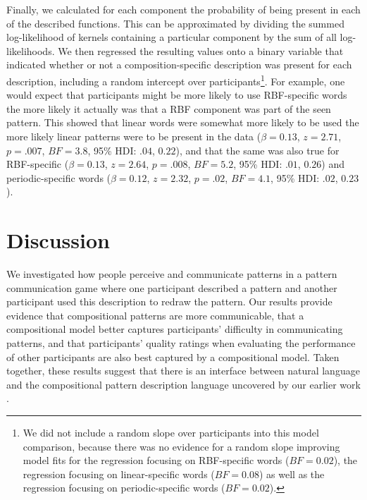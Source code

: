 \documentclass[a4paper,man, floatsintext, natbib]{apa6}
\begin{document}
Finally, we calculated for each component the probability of being present in each of the described functions. This can be approximated by dividing the summed log-likelihood of kernels containing a particular component by the sum of all log-likelihoods. We then regressed the resulting values onto a binary variable that indicated whether or not a composition-specific description was present for each description, including a random intercept over participants\footnote{We did not include a random slope over participants into this model comparison, because there was no evidence for a random slope improving model fits for the regression focusing on RBF-specific words ($BF=0.02$), the regression focusing on linear-specific words ($BF=0.08$) as well as the regression focusing on periodic-specific words ($BF=0.02$).}. For example, one would expect that participants might be more likely to use RBF-specific words the more likely it actually was that a RBF component was part of the seen pattern. This showed that linear words were somewhat more likely to be used the more likely linear patterns were to be present in the data ($\beta=0.13$, $z=2.71$, $p=.007$, $BF=3.8$, 95\% HDI: $.04$, $0.22$), and that the same was also true for RBF-specific ($\beta=0.13$, $z=2.64$, $p=.008$, $BF=5.2$, 95\% HDI: $.01$, $0.26$) and periodic-specific words ($\beta=0.12$, $z=2.32$, $p=.02$, $BF=4.1$, 95\% HDI: $.02$, $0.23$). 


\section{Discussion}

We investigated how people perceive and communicate patterns in a pattern communication game where one participant described a pattern and another participant used this description to redraw the pattern. Our results provide evidence that compositional patterns are more communicable, that a compositional model better captures participants' difficulty in communicating patterns, and that participants' quality ratings when evaluating the performance of other participants are also best captured by a compositional model. Taken together, these results suggest that there is an interface between natural language and the compositional pattern description language uncovered by our earlier work \citep{schulz2017compositional}.
\end{document}
